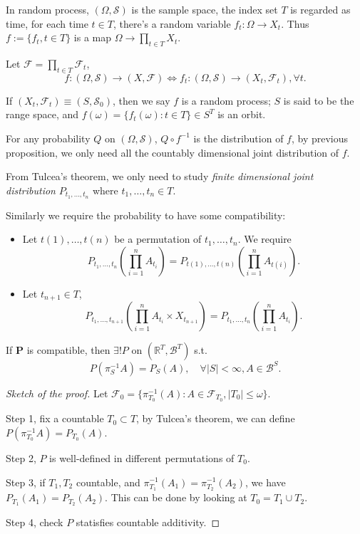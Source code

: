 In random process, $(\Omega, \mathscr{S})$ is the sample space,
the index set $T$ is regarded as time,
for each time $t\in T$, there's a random variable $f_t: \Omega \to X_t$.
Thus $f := \{f_t, t\in T\}$ is a map $\Omega\to \prod_{t\in T}X_t$.

\begin{theorem}
    Let $ \mathscr{F} = \prod_{t\in T} \mathscr{F}_t$,
	\[
	f:(\Omega, \mathscr{S})\to (X, \mathscr{F}) \iff
	f_t:(\Omega, \mathscr{S}) \to (X_t, \mathscr{F}_t), \forall t.
	\]
\end{theorem}

If $(X_t, \mathscr{F}_t)\equiv (S, \mathscr{S}_0)$, then we say $f$ is a random
process; $S$ is said to be the range space,
and $f(\omega) = \{f_t(\omega): t\in T\}\in S^T$ is an orbit.

For any probability $Q$ on $(\Omega, \mathscr{S})$, $Q\circ f^{-1}$ is
the distribution of $f$, by previous proposition,
we only need all the countably dimensional joint distribution of $f$.

From Tulcea's theorem, we only need to study
\textit{finite dimensional joint distribution} $P_{t_1, \dots, t_n}$ where
$t_1, \dots, t_n \in T$.

Similarly we require the probability to have some compatibility:
\begin{itemize}
	\item Let $t(1), \dots, t(n)$ be a permutation of $ t_1, \dots, t_n$.
		We require
		\[
			P_{t_1, \dots, t_n}\left(\prod_{i=1}^n A_{t_i}\right)
			= P_{t(1),\dots, t(n)}\left(\prod_{i=1}^n A_{t(i)}\right).
		\]
	\item Let $t_{n+1} \in T$,
		\[
		P_{t_1, \dots, t_{n+1}}\left(\prod_{i=1}^n A_{t_i} \times X_{t_{n+1}}\right)
		= P_{t_1, \dots, t_n}\left(\prod_{i=1}^n A_{t_i}\right).
		\]
\end{itemize}

\begin{theorem}[Kolmogorov]
    If $\mathbf{P}$ is compatible, then $\exists! P $ on
	$(\mathbb{R}^T, \mathscr{B}^T)$ s.t.
	\[
	P(\pi_S^{-1} A) = P_S(A),\quad \forall |S| < \infty, A\in \mathscr{B}^S.
	\]
\end{theorem}
\begin{proof}[Sketch of the proof]
    Let $\mathscr{F}_0 = \{\pi_{T_0}^{-1}(A): A\in \mathscr{F}_{T_0},
	|T_0|\le \omega\}$.

	Step 1, fix a countable $T_0 \subset T$,
	by Tulcea's theorem, we can define $P(\pi_{T_0}^{-1}A) = P_{T_0}(A)$.

	Step 2, $P$ is well-defined in different permutations of $T_0$.

	Step 3, if $T_1, T_2$ countable, and $\pi_{T_1}^{-1}(A_1) = \pi_{T_2}^{-1}(A_2)$,
	we have $P_{T_1}(A_1) = P_{T_2}(A_2)$.
	This can be done by looking at $T_0 = T_1\cup T_2$.

	Step 4, check $P$ statisfies countable additivity.
\end{proof}

